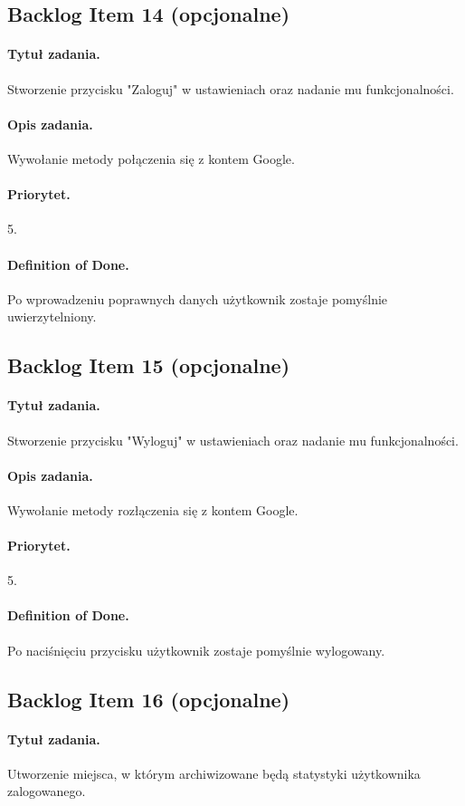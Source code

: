 \documentclass[a4paper]{article}
\begin{document}
\subsection{Backlog Item 14 (opcjonalne)}
\paragraph{Tytuł zadania.} Stworzenie przycisku "Zaloguj" w ustawieniach oraz nadanie mu funkcjonalności.
\paragraph{Opis zadania.} Wywołanie metody połączenia się z kontem Google.
\paragraph{Priorytet.} 5.
\paragraph{Definition of Done.} Po wprowadzeniu poprawnych danych użytkownik zostaje pomyślnie uwierzytelniony.

\subsection{Backlog Item 15 (opcjonalne)}
\paragraph{Tytuł zadania.} Stworzenie przycisku "Wyloguj" w ustawieniach oraz nadanie mu funkcjonalności.
\paragraph{Opis zadania.} Wywołanie metody rozłączenia się z kontem Google.
\paragraph{Priorytet.} 5.
\paragraph{Definition of Done.} Po naciśnięciu przycisku użytkownik zostaje pomyślnie wylogowany.

\subsection{Backlog Item 16 (opcjonalne)}
\paragraph{Tytuł zadania.} Utworzenie miejsca, w którym archiwizowane będą statystyki użytkownika zalogowanego.
\end{document}
